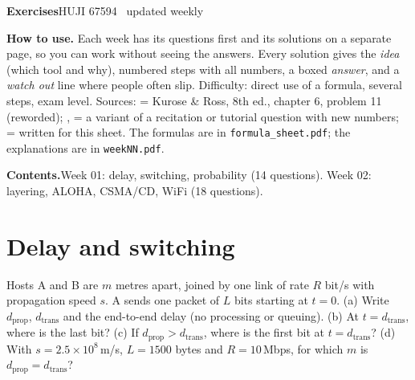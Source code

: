 \newcommand{\idea}[1]{\par\noindent{\color{pcyan}\sffamily\bfseries Idea.}\ #1\par}
\newcommand{\ans}[1]{\par\noindent\colorbox{surface2}{\parbox{\dimexpr\linewidth-2\fboxsep}{{\color{pgreen}\sffamily\bfseries Answer.}\ #1}}\par}
\newcommand{\watch}[1]{\par\noindent{\color{pgold}\sffamily\bfseries Watch out:}\ #1\par}



{\sffamily\bfseries\fontsize{24}{28}\selectfont\color{pgold}Exercises}\hfill{\ttfamily\small\color{pgreen}HUJI 67594 \textperiodcentered\ updated weekly}\par
\vspace{2pt}{\color{border}\rule{\linewidth}{1.4pt}}\par
\begin{plainbox}
\textbf{How to use.} Each week has its questions first and its solutions on a separate page, so you can work without seeing the answers. Every solution gives the \emph{idea} (which tool and why), numbered steps with all numbers, a boxed \emph{answer}, and a \emph{watch out} line where people often slip.
Difficulty:  direct use of a formula,  several steps,  exam level. Sources:
 = Kurose \& Ross, 8th ed., chapter 6, problem 11 (reworded); ,  = a variant of a recitation or tutorial question with new numbers;  = written for this sheet.
The formulas are in \texttt{formula\_sheet.pdf}; the explanations are in \texttt{weekNN.pdf}.
\end{plainbox}

\noindent\textbf{Contents.}\quad Week 01: delay, switching, probability (14 questions). \quad Week 02: layering, ALOHA, CSMA/CD, WiFi (18 questions).


\section{Delay and switching}

Hosts A and B are $m$ metres apart, joined by one link of rate $R$ bit/s with propagation speed $s$. A sends one packet of $L$ bits starting at $t=0$.
(a) Write $d_{\text{prop}}$, $d_{\text{trans}}$ and the end-to-end delay (no processing or queuing).
(b) At $t=d_{\text{trans}}$, where is the last bit?
(c) If $d_{\text{prop}}>d_{\text{trans}}$, where is the first bit at $t=d_{\text{trans}}$?
(d) With $s=2.5\times10^8$\,m/s, $L=1500$ bytes and $R=10$\,Mbps, for which $m$ is $d_{\text{prop}}=d_{\text{trans}}$?

